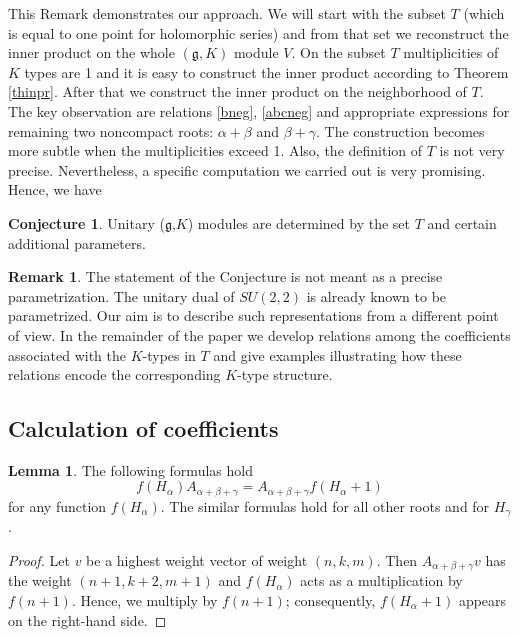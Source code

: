 \documentclass[twoside,a4paper,12pt]{article}
\newcommand{\g}{\ensuremath{\mathfrak g}}
\theoremstyle{definition}
\newtheorem{remark}{Remark}
\newtheorem{lemma}{Lemma}
\newtheorem{conjecture}{Conjecture}
\begin{document}
This Remark demonstrates our approach. We will start with the subset $T$
(which is equal to one point for holomorphic series) and from that set we
reconstruct the inner product on the whole $(\g,K)$ module $V$. On the subset
$T$ multiplicities of $K$ types are 1 and it is easy to construct the inner
product according to Theorem \ref{thinpr}. After that we construct the
inner product on the neighborhood of $T$. The key observation are relations
\eqref{bneg}, \eqref{abcneg} and appropriate expressions for remaining two
noncompact roots: $\alpha+\beta$ and $\beta+\gamma$. The construction becomes
more subtle when the multiplicities exceed 1. Also, the definition of $T$ is
not very precise.
Nevertheless, a specific computation we carried out is very promising.
Hence, we have

\begin{conjecture}
	Unitary (\g,$K$) modules are determined by the set $T$ and certain
	additional parameters.
\end{conjecture}

\begin{remark}
	The statement of the Conjecture is not meant as a precise parametrization.
	The unitary dual of $SU(2,2)$ is already known to be parametrized. Our aim
	is to describe such representations from a different point of view. In the
	remainder of the paper we develop relations among the coefficients
	associated with the $K$-types in $T$ and give examples illustrating how
	these relations encode the corresponding $K$-type structure.
\end{remark}




\subsection{Calculation of coefficients}

\begin{lemma}
	The following formulas hold
	\begin{equation}\label{commfun}
		f(H_\alpha)A_{\alpha+\beta+\gamma}=A_{\alpha+\beta+\gamma}f(H_\alpha+1)
	\end{equation}
	for any function $f(H_\alpha)$. The similar formulas hold for all other
	roots and for $H_\gamma$.
\end{lemma}

\begin{proof}
	Let $v$ be a highest weight vector of weight $(n,k,m)$. Then
	$A_{\alpha+\beta+\gamma}v$ has the weight $(n+1,k+2,m+1)$ and
	$f(H_\alpha)$ acts as a multiplication by $f(n+1)$. Hence, we multiply by 
	$f(n+1)$; consequently, $f(H_\alpha+1)$ appears on the right-hand side.
\end{proof}
\end{document}
